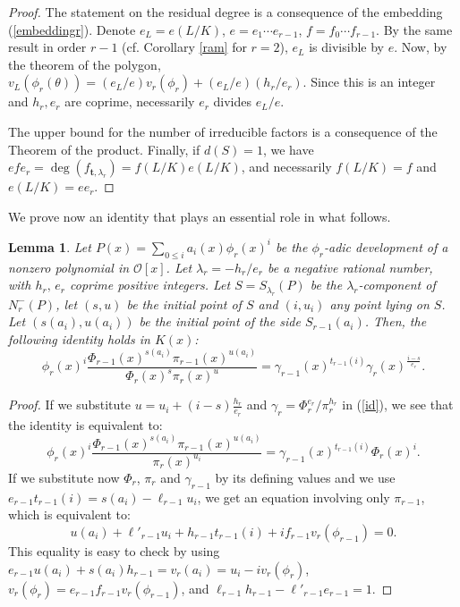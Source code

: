 \documentclass{amsart}
\newtheorem{lemma}[theorem]{Lemma}
\def\op{\operatorname}
\def\dg{\op{deg}}
\def\ga{\gamma}
\def\la{\lambda}
\def\oo{{\mathcal O}}
\def\t{\theta}
\def\ty{\mathbf{t}}
\def\zpx{\oo[x]}
\begin{document}
\begin{proof}
The statement on the residual degree is a consequence of the embedding (\ref{embeddingr}). Denote $e_L=e(L/K)$, $e=e_1\cdots e_{r-1}$, $f=f_0\cdots f_{r-1}$. By the same result in order $r-1$ (cf. Corollary \ref{ram} for $r=2$), $e_L$ is divisible by $e$. Now, by the theorem of the polygon,
$v_L(\phi_r(\t))=(e_L/e)v_r(\phi_r)+(e_L/e)(h_r/e_r)$.  Since this is an integer and $h_r,e_r$ are coprime, necessarily $e_r$ divides $e_L/e$. 

The upper bound for the number of irreducible factors is a consequence of the Theorem of the product. Finally, if $d(S)=1$, we have $efe_r=\dg(f_{\ty,\la_r})=f(L/K)e(L/K)$, and necessarily $f(L/K)=f$ and $e(L/K)=ee_r$. 
\end{proof}


We prove now an identity that plays an essential role in what follows.

\begin{lemma}\label{identity}
Let $P(x)=\sum_{0\le i}a_i(x)\phi_r(x)^i$ be the $\phi_r$-adic development of a nonzero polynomial in $\zpx$. Let $\la_r=-h_r/e_r$ be a negative rational number, with $h_r,\,e_r$ coprime positive integers. Let $S=S_{\la_r}(P)$ be the $\la_r$-component of $N_r^-(P)$, let $(s,u)$ be the initial point of $S$ and $(i,u_i)$ any point lying on $S$. Let $(s(a_i),u(a_i))$ be the initial point of the side $S_{r-1}(a_i)$. Then, the following identity holds in $K(x)$:
\begin{equation}\label{id}
\phi_r(x)^i\dfrac{\Phi_{r-1}(x)^{s(a_i)}\pi_{r-1}(x)^{u(a_i)}}{\Phi_r(x)^s\pi_r(x)^u}=\ga_{r-1}(x)^{t_{r-1}(i)}\ga_r(x)^{\frac{i-s}{e_r}}.
\end{equation}
\end{lemma}

\begin{proof}
If we substitute $u=u_i+(i-s)\frac{h_r}{e_r}$ and $\ga_r=\Phi_r^{e_r}/\pi_r^{h_r}$ in (\ref{id}), we see that the identity is equivalent to:
$$
\phi_r(x)^i\dfrac{\Phi_{r-1}(x)^{s(a_i)}\pi_{r-1}(x)^{u(a_i)}}{\pi_r(x)^{u_i}}=\ga_{r-1}(x)^{t_{r-1}(i)}\Phi_r(x)^i.
$$
If we substitute now $\Phi_r$, $\pi_r$ and $\ga_{r-1}$ by its defining values and we use $e_{r-1}t_{r-1}(i)=s(a_i)-\ell_{r-1}u_i$, we get an equation involving only $\pi_{r-1}$, which is equivalent to: 
$$
u(a_i)+\ell'_{r-1}u_i+h_{r-1}t_{r-1}(i)+if_{r-1}v_r(\phi_{r-1})=0.
$$ 
This equality is easy to check by using $e_{r-1}u(a_i)+s(a_i)h_{r-1}=v_r(a_i)=u_i-iv_r(\phi_r)$, $v_r(\phi_r)=e_{r-1}f_{r-1}v_r(\phi_{r-1})$, and $\ell_{r-1}h_{r-1}-\ell'_{r-1}e_{r-1}=1$.
\end{proof}
\end{document}
